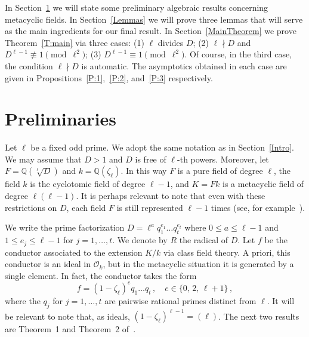\documentclass[12pt]{amsart}
\def\Q{\mathbb{Q}}
\begin{document}
In Section~\ref{Prelim}
we will state some preliminary algebraic results concerning metacyclic fields.
In Section~\ref{Lemmas}
we will prove three lemmas that will serve as the main ingredients for our final result.
In Section~\ref{MainTheorem} we prove Theorem~\ref{T:main} via three cases:
(1) $\ell$ divides $D$;
(2) $\ell\nmid D$ and $D^{\ell-1}\not\equiv 1\pmod{\ell^2}$;
(3) $D^{\ell-1}\equiv 1\pmod{\ell^2}$.
Of course, in the third case, the condition $\ell\nmid D$ is automatic.
The asymptotics obtained in each case are given in
Propositions~\ref{P:1},~\ref{P:2}, and~\ref{P:3} respectively.


\section{Preliminaries}\label{Prelim}

Let $\ell$ be a fixed odd prime.
We adopt the same notation as in Section~\ref{Intro}.
We may assume that $D>1$ and $D$ is free of $\ell$-th powers.
Moreover, let $F=\Q(\sqrt[\ell]{D})$ and $k=\Q(\zeta_\ell)$.
In this way $F$ is a pure field of degree $\ell$, the field $k$ is the cyclotomic field
of degree $\ell-1$, and $K=Fk$ is a metacyclic field of degree $\ell(\ell-1)$.
It is perhaps relevant to note
that even with these restrictions on $D$, each field $F$ is still represented $\ell-1$ times
(see, for example~\cite[Lemma~3.2]{BMPWW}).

We write the prime factorization $D=\ell^a q_1^{e_1}\dots q_t^{e_t}$
where $0\leq a\leq \ell-1$ and $1\leq e_j\leq \ell-1$ for $j=1,\dots, t$.
We denote by $R$ the radical of $D$.
Let $f$ be the conductor associated to the extension $K/k$ via class field theory.
A priori, this conductor is an ideal in $\mathcal{O}_k$, but in the metacyclic situation it is generated
by a single element.  In fact, the conductor takes the form
\begin{equation}\label{conductor}
  f =(1-\zeta_\ell)^e q_1\dots q_t
  \,,\quad
  e\in\{0,\,2,\,\ell+1\}
  \,,
\end{equation} 
where the $q_j$ for $j=1,\dots, t$ 
are pairwise rational primes distinct from $\ell$.
It will be relevant to note that, as ideals, $(1-\zeta_\ell)^{\ell-1}=(\ell)$.
The next two results are Theorem~1 and Theorem~2 of~\cite{Mayer}.
\end{document}
